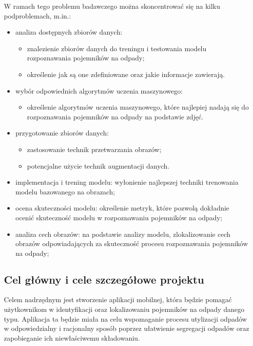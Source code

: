 \documentclass[12pt, a4paper, twoside, openany]{book}
\begin{document}
W ramach tego problemu badawczego można skoncentrować się na kilku podproblemach, m.in.:
\begin{itemize}
    \item analiza dostępnych zbiorów danych:
          \begin{itemize}
              \item znalezienie zbiorów danych do treningu i testowania modelu rozpoznawania pojemników na odpady;
              \item określenie jak są one zdefiniowane oraz jakie informacje zawierają.
          \end{itemize}
    \item wybór odpowiednich algorytmów uczenia maszynowego:
          \begin{itemize}
              \item określenie algorytmów uczenia maszynowego, które najlepiej nadają się do rozpoznawania pojemników na odpady na podstawie zdjęć.
          \end{itemize}
    \item przygotowanie zbiorów danych:
          \begin{itemize}
              \item zastosowanie technik przetwarzania obrazów;
              \item potencjalne użycie technik augmentacji danych.
          \end{itemize}
    \item implementacja i trening modelu: wyłonienie najlepszej techniki trenowania modelu bazowanego na obrazach;
    \item ocena skuteczności modelu: określenie metryk, które pozwolą dokładnie ocenić skuteczność modelu w rozpoznawaniu pojemników na odpady;
    \item analiza cech obrazów: na podstawie analizy modelu, zlokalizowanie cech obrazów odpowiadających za skuteczność procesu rozpoznawania pojemników na odpady;
\end{itemize}

\subsection{Cel główny i cele szczegółowe projektu}

Celem nadrzędnym jest stworzenie aplikacji mobilnej, która będzie pomagać użytkownikom w identyfikacji oraz lokalizowaniu pojemników na odpady danego typu. Aplikacja ta będzie miała na celu wspomaganie procesu utylizacji odpadów w odpowiedzialny i racjonalny sposób poprzez ułatwienie segregacji odpadów oraz zapobieganie ich niewłaściwemu składowaniu.
\end{document}
